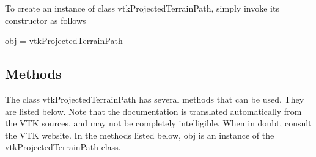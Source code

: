 To create an instance of class vtk\-Projected\-Terrain\-Path, simply invoke its constructor as follows \begin{DoxyVerb}  obj = vtkProjectedTerrainPath
\end{DoxyVerb}
 \hypertarget{vtkwidgets_vtkxyplotwidget_Methods}{}\subsection{Methods}\label{vtkwidgets_vtkxyplotwidget_Methods}
The class vtk\-Projected\-Terrain\-Path has several methods that can be used. They are listed below. Note that the documentation is translated automatically from the V\-T\-K sources, and may not be completely intelligible. When in doubt, consult the V\-T\-K website. In the methods listed below, {\ttfamily obj} is an instance of the vtk\-Projected\-Terrain\-Path class. 

